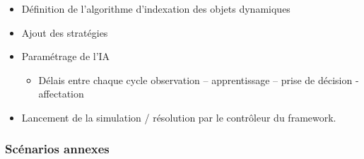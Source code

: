 \begin{itemize}
\item Définition de l'algorithme d'indexation des objets dynamiques
\item Ajout des stratégies
\item Paramétrage de l'IA
	\begin{itemize}
	\item Délais entre chaque cycle \og observation – apprentissage – prise de décision - affectation \fg
	\end{itemize}
\item Lancement de la simulation / résolution par le contrôleur du framework.
\end{itemize} %


\subsubsection{Scénarios annexes}

